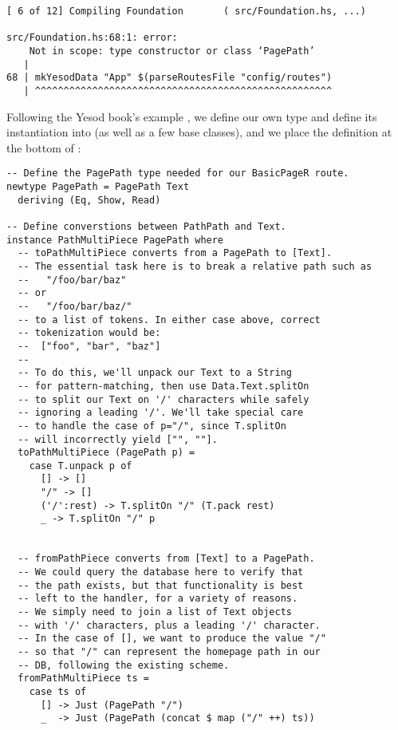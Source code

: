 \begin{Verbatim}
[ 6 of 12] Compiling Foundation       ( src/Foundation.hs, ...)

src/Foundation.hs:68:1: error:
    Not in scope: type constructor or class ‘PagePath’
   |
68 | mkYesodData "App" $(parseRoutesFile "config/routes")
   | ^^^^^^^^^^^^^^^^^^^^^^^^^^^^^^^^^^^^^^^^^^^^^^^^^^^^

\end{Verbatim}

Following the Yesod book's example \cite{ybkRouting}, we define our own  type and define its instantiation into  (as well as a few base classes), and we place the definition at the bottom of :

\begin{Verbatim}
-- Define the PagePath type needed for our BasicPageR route.
newtype PagePath = PagePath Text
  deriving (Eq, Show, Read)

-- Define converstions between PathPath and Text.
instance PathMultiPiece PagePath where
  -- toPathMultiPiece converts from a PagePath to [Text].
  -- The essential task here is to break a relative path such as
  --   "/foo/bar/baz"
  -- or
  --   "/foo/bar/baz/"
  -- to a list of tokens. In either case above, correct
  -- tokenization would be:
  --  ["foo", "bar", "baz"]
  --
  -- To do this, we'll unpack our Text to a String
  -- for pattern-matching, then use Data.Text.splitOn 
  -- to split our Text on '/' characters while safely
  -- ignoring a leading '/'. We'll take special care
  -- to handle the case of p="/", since T.splitOn
  -- will incorrectly yield ["", ""].
  toPathMultiPiece (PagePath p) = 
    case T.unpack p of
      [] -> []
      "/" -> []
      ('/':rest) -> T.splitOn "/" (T.pack rest)
      _ -> T.splitOn "/" p
        

  -- fromPathPiece converts from [Text] to a PagePath.
  -- We could query the database here to verify that
  -- the path exists, but that functionality is best
  -- left to the handler, for a variety of reasons.
  -- We simply need to join a list of Text objects
  -- with '/' characters, plus a leading '/' character.
  -- In the case of [], we want to produce the value "/"
  -- so that "/" can represent the homepage path in our
  -- DB, following the existing scheme.
  fromPathMultiPiece ts =
    case ts of
      [] -> Just (PagePath "/")
      _  -> Just (PagePath (concat $ map ("/" ++) ts))
\end{Verbatim}

